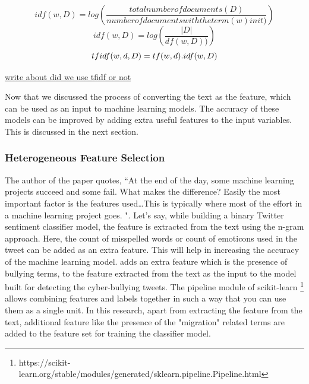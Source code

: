 \begin{equation}
\label{eqn:5}
idf(w,D) = log (\frac{total number of documents(D)}{number of documents with the term(w) in it)})
\end{equation}
\begin{equation}
\label{eqn:6}
idf(w,D) = log (\frac{|D|}{df(w,D))})
\end{equation}
\begin{equation}
\label{eqn:7}
tf\-idf(w,d,D) = tf(w,d) . idf(w,D)
\end{equation}


\underline{write about  did we use tfidf or not}

Now that we discussed the process of converting the text as the feature, which can be used as an input to machine learning models. The accuracy of these models can be improved by adding extra useful features to the input variables. This is discussed in the next section.


\subsubsection{Heterogeneous Feature Selection}
The author of the paper \cite{Domingos:2012} quotes, ``At the end of the day, some machine learning projects succeed and some fail. What makes the difference? Easily the most important factor is the features used…This is typically where most of the effort in a machine learning project goes. ".  Let's say, while building a binary Twitter sentiment classifier model, the feature is extracted from the text using the n-gram approach. Here, the count of misspelled words or count of emoticons used in the tweet can be added as an extra feature. This will help in increasing the accuracy of the machine learning model. \cite{Cortis} adds an extra feature which is the presence of bullying terms, to the feature extracted from the text as the input to the model built for detecting the cyber-bullying tweets. The pipeline module of scikit-learn \cite{scikit-learn} \footnote{https://scikit-learn.org/stable/modules/generated/sklearn.pipeline.Pipeline.html} allows combining features and labels together in such a way that you can use them as a single unit. In this research,  apart from extracting the feature from the text, additional feature like the presence of the "migration" related terms are added to the feature set for training the classifier model. 
